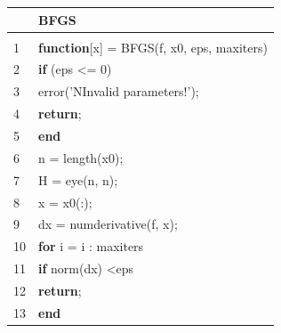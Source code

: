\documentclass[bosnian,12pt,a4paper]{report}
\begin{document}
\begin{tabular}{ll}
   & BFGS                                                                              \\ \hline \\
1  & \textbf{function}{[}x{]} = BFGS(f, x0, eps, maxiters)                                                \\
2  & \hspace*{1cm}\textbf{if} (eps \textless{}=  0)                                             \\
3  & \hspace*{2cm}error('NInvalid parameters!');                                                            \\
4  & \hspace*{2cm}\textbf{return};                                                                                    \\
5  & \hspace*{1cm}\textbf{end                                                                                       } \\
6  & \hspace*{1cm}n = length(x0);                                                                            \\
7  & \hspace*{1cm}H = eye(n, n);                                                                             \\
8  & \hspace*{1cm}x = x0(:);                                                                                    \\
9  & \hspace*{1cm}dx = numderivative(f, x);                                                                                    \\
10 & \hspace*{1cm}\textbf{for} i = i : maxiters                                                                        
\\
11 & \hspace*{2cm}\textbf{if} norm(dx) \textless  eps                                                 \\
12 & \hspace*{3cm}\textbf{return};                                                                                    \\
13 & \hspace*{2cm}\textbf{end                                                                                       } \\

\end{tabular}
\end{document}
